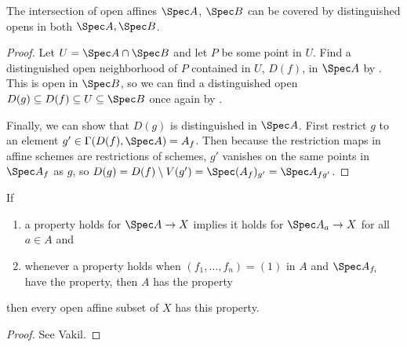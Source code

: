 \begin{lem}\label{lem:nike}
	The intersection of open affines $\Spec A $, $\Spec B $ can be covered by distinguished opens in both $\Spec A, \Spec B $.
\end{lem}
\begin{proof}
	Let $U = \Spec A \cap \Spec B $ and let $P $ be some point in $U $.
	Find a distinguished open neighborhood of $P $ contained in $U $, $D(f)$, in $\Spec A $ by .
	This is open in $\Spec B $, so we can find a distinguished open $D(g) \subseteq D(f) \subseteq U \subseteq \Spec B$ once again by .

	Finally, we can show that $D(g) $ is distinguished in $\Spec A $.
	First restrict $g $ to an element $g' \in \Gamma(D(f), \Spec A) = A_f$.
	Then because the restriction maps in affine schemes are restrictions of schemes, $g' $ vanishes on the same points in $\Spec A_f $ as $g $, so $D(g) = D(f) \setminus V(g') = \Spec (A_f)_{g'} = \Spec A_{fg'}$.
\end{proof}

\begin{lem}\label{lem:affine_comm}
	If
	\begin{enumerate}
		\item a property holds for $\Spec A \to X $ implies it holds for $\Spec A_a\to X $ for all $a\in A $ and
		\item whenever a property holds when $(f_1,\ldots,f_n) = (1) $ in $A $ and $\Spec A_{f_i} $ have the property, then $A $ has the property
	\end{enumerate}
	then every open affine subset of $X $ has this property.
\end{lem}
\begin{proof}
	See Vakil.
\end{proof}


